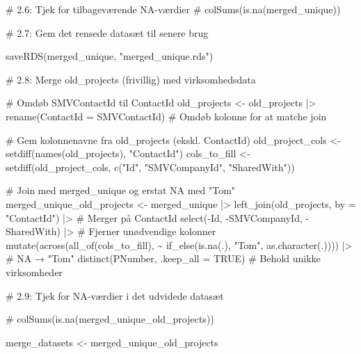 \documentclass[
  11pt,
  letterpaper,
  DIV=11,
  numbers=noendperiod]{scrartcl}
\newenvironment{Shaded}{\begin{snugshade}}{\end{snugshade}}
\newcommand{\AttributeTok}[1]{\textcolor[rgb]{0.40,0.45,0.13}{#1}}
\newcommand{\CommentTok}[1]{\textcolor[rgb]{0.37,0.37,0.37}{#1}}
\newcommand{\ConstantTok}[1]{\textcolor[rgb]{0.56,0.35,0.01}{#1}}
\newcommand{\FunctionTok}[1]{\textcolor[rgb]{0.28,0.35,0.67}{#1}}
\newcommand{\NormalTok}[1]{\textcolor[rgb]{0.00,0.23,0.31}{#1}}
\newcommand{\OtherTok}[1]{\textcolor[rgb]{0.00,0.23,0.31}{#1}}
\newcommand{\SpecialCharTok}[1]{\textcolor[rgb]{0.37,0.37,0.37}{#1}}
\newcommand{\StringTok}[1]{\textcolor[rgb]{0.13,0.47,0.30}{#1}}
\begin{document}
\begin{Shaded}
\begin{Highlighting}[]
\CommentTok{\# 2.6: Tjek for tilbageværende NA{-}værdier}
\CommentTok{\# colSums(is.na(merged\_unique))}


\CommentTok{\# 2.7: Gem det rensede datasæt til senere brug}

\FunctionTok{saveRDS}\NormalTok{(merged\_unique, }\StringTok{"merged\_unique.rds"}\NormalTok{)}

\CommentTok{\# 2.8: Merge old\_projects (frivillig) med virksomhedsdata}

\CommentTok{\# Omdøb SMVContactId til ContactId}
\NormalTok{old\_projects }\OtherTok{\textless{}{-}}\NormalTok{ old\_projects }\SpecialCharTok{|\textgreater{}}
  \FunctionTok{rename}\NormalTok{(}\AttributeTok{ContactId =}\NormalTok{ SMVContactId) }\CommentTok{\# Omdøb kolonne for at matche join}

\CommentTok{\# Gem kolonnenavne fra old\_projects (ekskl. ContactId)}
\NormalTok{old\_project\_cols }\OtherTok{\textless{}{-}} \FunctionTok{setdiff}\NormalTok{(}\FunctionTok{names}\NormalTok{(old\_projects), }\StringTok{"ContactId"}\NormalTok{)}
\NormalTok{cols\_to\_fill }\OtherTok{\textless{}{-}} \FunctionTok{setdiff}\NormalTok{(old\_project\_cols, }\FunctionTok{c}\NormalTok{(}\StringTok{"Id"}\NormalTok{, }\StringTok{"SMVCompanyId"}\NormalTok{, }\StringTok{"SharedWith"}\NormalTok{))}

\CommentTok{\# Join med merged\_unique og erstat NA med "Tom"}
\NormalTok{merged\_unique\_old\_projects }\OtherTok{\textless{}{-}}\NormalTok{ merged\_unique }\SpecialCharTok{|\textgreater{}}
  \FunctionTok{left\_join}\NormalTok{(old\_projects, }\AttributeTok{by =} \StringTok{"ContactId"}\NormalTok{) }\SpecialCharTok{|\textgreater{}}   \CommentTok{\# Merger på ContactId}
  \FunctionTok{select}\NormalTok{(}\SpecialCharTok{{-}}\NormalTok{Id, }\SpecialCharTok{{-}}\NormalTok{SMVCompanyId, }\SpecialCharTok{{-}}\NormalTok{SharedWith) }\SpecialCharTok{|\textgreater{}}     \CommentTok{\# Fjerner unødvendige kolonner}
  \FunctionTok{mutate}\NormalTok{(}\FunctionTok{across}\NormalTok{(}\FunctionTok{all\_of}\NormalTok{(cols\_to\_fill), }
                \SpecialCharTok{\textasciitilde{}} \FunctionTok{if\_else}\NormalTok{(}\FunctionTok{is.na}\NormalTok{(.), }\StringTok{"Tom"}\NormalTok{, }\FunctionTok{as.character}\NormalTok{(.)))) }\SpecialCharTok{|\textgreater{}} \CommentTok{\# NA → "Tom"}
  \FunctionTok{distinct}\NormalTok{(PNumber, }\AttributeTok{.keep\_all =} \ConstantTok{TRUE}\NormalTok{)            }\CommentTok{\# Behold unikke virksomheder}


\CommentTok{\# 2.9: Tjek for NA{-}værdier i det udvidede datasæt}

\CommentTok{\# colSums(is.na(merged\_unique\_old\_projects))}

\NormalTok{merge\_datasets }\OtherTok{\textless{}{-}}\NormalTok{ merged\_unique\_old\_projects}
\end{Highlighting}
\end{Shaded}
\end{document}
